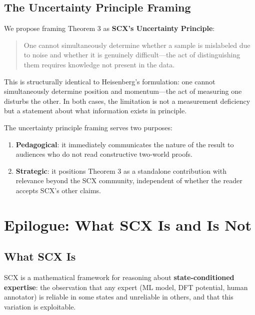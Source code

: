 \documentclass[12pt,a4paper]{ctexart}
\begin{document}
\subsection{The Uncertainty Principle Framing}

We propose framing Theorem 3 as \textbf{SCX's Uncertainty Principle}:

\begin{quote}
One cannot simultaneously determine whether a sample is mislabeled due to noise and whether it is genuinely difficult—the act of distinguishing them requires knowledge not present in the data.
\end{quote}

This is structurally identical to Heisenberg's formulation: one cannot simultaneously determine position and momentum—the act of measuring one disturbs the other. In both cases, the limitation is not a measurement deficiency but a statement about what information exists in principle.

The uncertainty principle framing serves two purposes:
\begin{enumerate}
\item \textbf{Pedagogical}: it immediately communicates the nature of the result to audiences who do not read constructive two-world proofs.
\item \textbf{Strategic}: it positions Theorem 3 as a standalone contribution with relevance beyond the SCX community, independent of whether the reader accepts SCX's other claims.
\end{enumerate}

\section*{Epilogue: What SCX Is and Is Not}

\subsection*{What SCX Is}

SCX is a mathematical framework for reasoning about \textbf{state-conditioned expertise}: the observation that any expert (ML model, DFT potential, human annotator) is reliable in some states and unreliable in others, and that this variation is exploitable.
\end{document}
